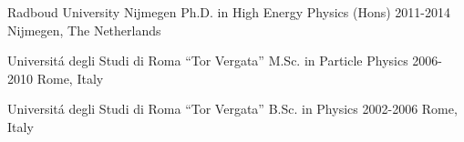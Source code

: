 

\begin{cveducations}

\cveducation
{Radboud University Nijmegen} %
{Ph.D. in High Energy Physics (Hons)} %
{2011-2014} %
{Nijmegen, The Netherlands} %
{\PhdThesis} %
\skipV

\cveducation
{Universit\'a degli Studi di Roma ``Tor Vergata''} %
{M.Sc. in Particle Physics} %
{2006-2010} %
{Rome, Italy} %
{\MsThesis} %
\skipV

\cveducation
{Universit\'a degli Studi di Roma ``Tor Vergata''} %
{B.Sc. in Physics} %
{2002-2006} %
{Rome, Italy} %
{\BsThesis} %
\skipV

\end{cveducations}
